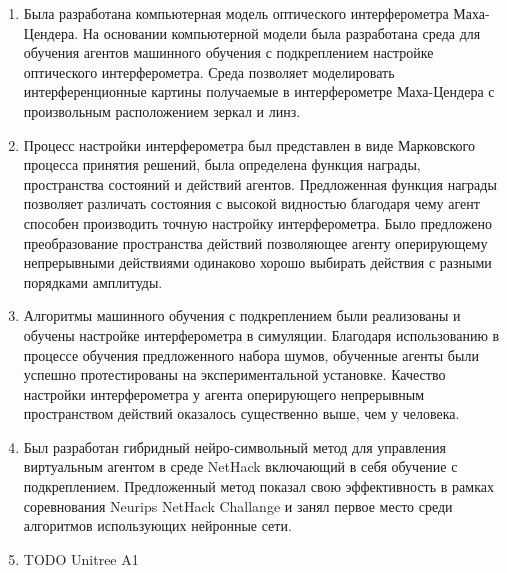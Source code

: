 \begin{enumerate}
  \item Была разработана компьютерная модель оптического интерферометра Маха-Цендера. На основании компьютерной модели была разработана среда для обучения агентов машинного обучения с подкреплением настройке оптического интерферометра. Среда позволяет моделировать интерференционные картины получаемые в интерферометре Маха-Цендера с произвольным расположением зеркал и линз. 
  \item Процесс настройки интерферометра был представлен в виде Марковского процесса принятия решений, была определена функция награды, пространства состояний и действий агентов. Предложенная функция награды позволяет различать состояния с высокой видностью благодаря чему агент способен производить точную настройку интерферометра. Было предложено преобразование пространства действий позволяющее агенту оперирующему непрерывными действиями одинаково хорошо выбирать действия с разными порядками амплитуды. 
  \item Алгоритмы машинного обучения с подкреплением были реализованы и обучены настройке интерферометра в симуляции. Благодаря использованию в процессе обучения предложенного набора шумов, обученные агенты были успешно протестированы на экспериментальной установке. Качество настройки интерферометра у агента оперирующего непрерывным пространством действий оказалось существенно выше, чем у человека. 
  \item Был разработан гибридный нейро-символьный метод для управления виртуальным агентом в среде NetHack включающий в себя обучение с подкреплением. Предложенный метод показал свою эффективность в рамках соревнования Neurips NetHack Challange и занял первое место среди алгоритмов использующих нейронные сети.
  \item TODO Unitree A1
\end{enumerate}

\newpage
